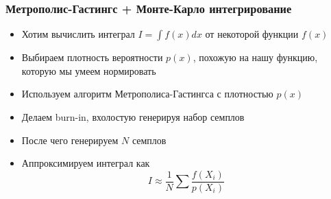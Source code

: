 \documentclass[10pt]{beamer}
\begin{document}
\begin{frame}
\frametitle{Метрополис-Гастингс + Монте-Карло интегрирование}
\begin{itemize}
\item Хотим вычислить интеграл \begin{math}I=\int f(x)dx\end{math} от некоторой функции \begin{math}f(x)\end{math}
\pause
\item Выбираем плотность вероятности \begin{math}p(x)\end{math}, похожую на нашу функцию, которую мы умеем нормировать
\pause
\item Используем алгоритм Метрополиса-Гастингса с плотностью \begin{math}p(x)\end{math}
\pause
\item Делаем burn-in, вхолостую генерируя набор семплов
\pause
\item После чего генерируем \begin{math}N\end{math} семплов
\pause
\item Аппроксимируем интеграл как
\begin{equation*}I \approx \frac{1}{N}\sum \frac{f(X_i)}{p(X_i)}\end{equation*}
\end{itemize}
\end{frame}
\end{document}
